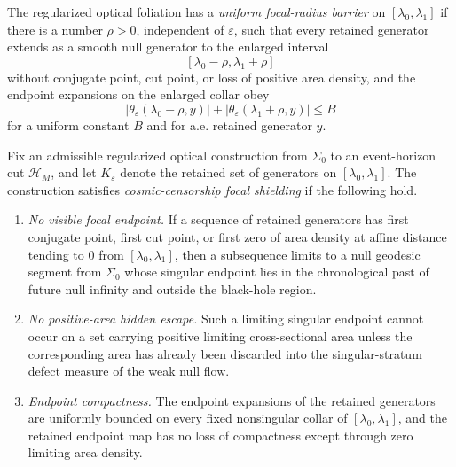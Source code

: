 \begin{definition}\label{def:UniformFocalRadiusBarrier}
The regularized optical foliation has a \emph{uniform focal-radius barrier} on $[\lambda_0,\lambda_1]$ if there is a number $\rho>0$, independent of $\varepsilon$, such that every retained generator extends as a smooth null generator to the enlarged interval
\[
    [\lambda_0-\rho,\lambda_1+\rho]
\]
without conjugate point, cut point, or loss of positive area density, and the endpoint expansions on the enlarged collar obey
\[
    |\theta_\varepsilon(\lambda_0-\rho,y)|
    +
    |\theta_\varepsilon(\lambda_1+\rho,y)|
    \le B
\]
for a uniform constant $B$ and for a.e. retained generator $y$.
\end{definition}

\begin{definition}\label{def:CosmicCensorshipFocalShielding}
Fix an admissible regularized optical construction from $\Sigma_0$ to an event-horizon cut $\mathcal H_M$, and let $K_\varepsilon$ denote the retained set of generators on $[\lambda_0,\lambda_1]$. The construction satisfies \emph{cosmic-censorship focal shielding} if the following hold.
\begin{enumerate}
    \item \emph{No visible focal endpoint.} If a sequence of retained generators has first conjugate point, first cut point, or first zero of area density at affine distance tending to $0$ from $[\lambda_0,\lambda_1]$, then a subsequence limits to a null geodesic segment from $\Sigma_0$ whose singular endpoint lies in the chronological past of future null infinity and outside the black-hole region.
    \item \emph{No positive-area hidden escape.} Such a limiting singular endpoint cannot occur on a set carrying positive limiting cross-sectional area unless the corresponding area has already been discarded into the singular-stratum defect measure of the weak null flow.
    \item \emph{Endpoint compactness.} The endpoint expansions of the retained generators are uniformly bounded on every fixed nonsingular collar of $[\lambda_0,\lambda_1]$, and the retained endpoint map has no loss of compactness except through zero limiting area density.
\end{enumerate}
\end{definition}

